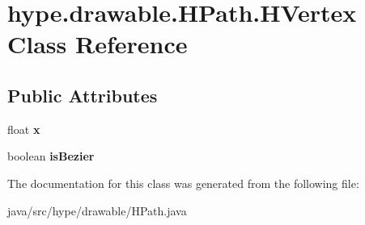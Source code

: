 \hypertarget{classhype_1_1drawable_1_1_h_path_1_1_h_vertex}{\section{hype.\-drawable.\-H\-Path.\-H\-Vertex Class Reference}
\label{classhype_1_1drawable_1_1_h_path_1_1_h_vertex}
}
\subsection*{Public Attributes}
\begin{DoxyCompactItemize}
\item 
\hypertarget{classhype_1_1drawable_1_1_h_path_1_1_h_vertex_a396973252443db070dcbbf656ce5ada4}{float {\bfseries x}}\label{classhype_1_1drawable_1_1_h_path_1_1_h_vertex_a396973252443db070dcbbf656ce5ada4}

\item 
\hypertarget{classhype_1_1drawable_1_1_h_path_1_1_h_vertex_a214c4ce545a96d3e355e288ebe468b25}{boolean {\bfseries is\-Bezier}}\label{classhype_1_1drawable_1_1_h_path_1_1_h_vertex_a214c4ce545a96d3e355e288ebe468b25}

\end{DoxyCompactItemize}


The documentation for this class was generated from the following file\-:\begin{DoxyCompactItemize}
\item 
java/src/hype/drawable/H\-Path.\-java\end{DoxyCompactItemize}
